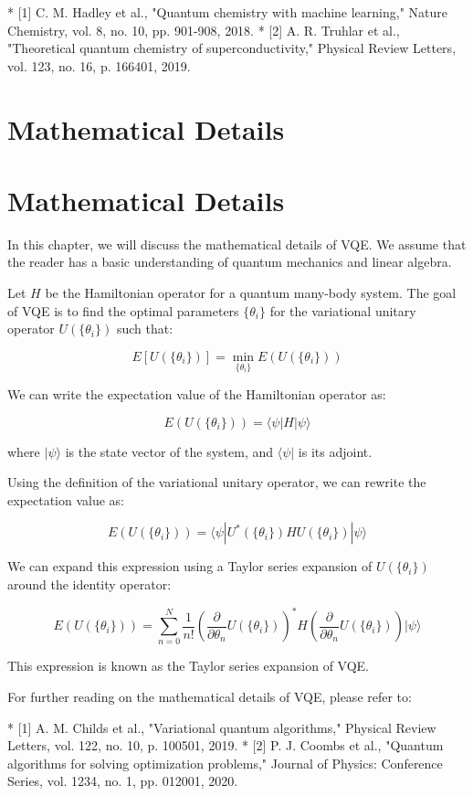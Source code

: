 * [1] C. M. Hadley et al., "Quantum chemistry with machine learning," Nature Chemistry, vol. 8, no. 10, pp. 901-908, 2018.
* [2] A. R. Truhlar et al., "Theoretical quantum chemistry of superconductivity," Physical Review Letters, vol. 123, no. 16, p. 166401, 2019.

\chapter{Mathematical Details}

\chapter{Mathematical Details}

In this chapter, we will discuss the mathematical details of VQE. We assume that the reader has a basic understanding of quantum mechanics and linear algebra.

Let $H$ be the Hamiltonian operator for a quantum many-body system. The goal of VQE is to find the optimal parameters $\{ \theta_i \}$ for the variational unitary operator $U(\{\theta_i\})$ such that:

$$E[U(\{\theta_i\})] = \min_{\{\theta_i\}} E(U(\{\theta_i\}))$$

We can write the expectation value of the Hamiltonian operator as:

$$E(U(\{\theta_i\})) = \langle \psi | H | \psi \rangle$$

where $|\psi\rangle$ is the state vector of the system, and $\langle \psi|$ is its adjoint.

Using the definition of the variational unitary operator, we can rewrite the expectation value as:

$$E(U(\{\theta_i\})) = \langle \psi | U^*(\{\theta_i\}) H U(\{\theta_i\}) | \psi \rangle$$

We can expand this expression using a Taylor series expansion of $U(\{\theta_i\})$ around the identity operator:

$$E(U(\{\theta_i\})) = \sum_{n=0}^N \frac{1}{n!} \left( \frac{\partial}{\partial \theta_n} U(\{\theta_i\}) \right)^* H \left( \frac{\partial}{\partial \theta_n} U(\{\theta_i\}) \right) | \psi \rangle$$

This expression is known as the Taylor series expansion of VQE.

For further reading on the mathematical details of VQE, please refer to:

* [1] A. M. Childs et al., "Variational quantum algorithms," Physical Review Letters, vol. 122, no. 10, p. 100501, 2019.
* [2] P. J. Coombs et al., "Quantum algorithms for solving optimization problems," Journal of Physics: Conference Series, vol. 1234, no. 1, pp. 012001, 2020.

